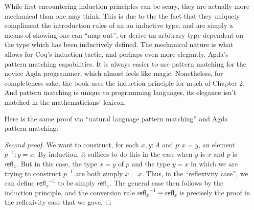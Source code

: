 \documentclass[11pt, a4paper]{article}
\newtheorem{proof}{Proof}
\newcommand{\jdeq}{\equiv}      %
\newcommand{\refl}[1]{\ensuremath{\mathsf{refl}_{#1}}\xspace}
\newcommand{\opp}[1]{\mathord{{#1}^{-1}}}
\begin{document}
While first encountering induction principles can be scary, they are actually
more mechanical than one may think. This is due to the the fact that they
uniquely compliment the introduction rules of an an inductive type, and are
simply a means of showing one can ``map out'', or derive an arbitrary type
dependent on the type which has been inductively defined. The mechanical nature
is what allows for Coq's induction tactic, and perhaps even more elegantly,
Agda's pattern matching capabilities. It is always easier to use pattern
matching for the novice Agda programmer, which almost feels like magic.
Nonetheless, for completeness sake, the book uses the induction principle for
much of Chapter 2. And pattern matching is unique to programming languages,
its elegance isn't matched in the mathematicians' lexicon.

Here is the same proof via ``natural language pattern matching'' and Agda
pattern matching:

\begin{proof}[Second proof]
  We want to construct, for each $x,y:A$ and $p:x=y$, an element $\opp{p}:y=x$.
  By induction, it suffices to do this in the case when $y$ is $x$ and $p$ is $\refl{x}$.
  But in this case, the type $x=y$ of $p$ and the type $y=x$ in which we are trying to construct $\opp{p}$ are both simply $x=x$.
  Thus, in the ``reflexivity case'', we can define $\opp{\refl{x}}$ to be simply $\refl{x}$.
  The general case then follows by the induction principle, and the conversion rule $\opp{\refl{x}}\jdeq\refl{x}$ is precisely the proof in the reflexivity case that we gave.
\end{proof}

\begin{code}%
\>[0]\<%
\\
\>[0][@{}l@{\AgdaIndent{1}}]%
\>[2]\AgdaSpace{}%
\AgdaSymbol{:}\AgdaSpace{}%
\AgdaSymbol{\{}\AgdaSpace{}%
\AgdaSymbol{:}\AgdaSpace{}%
\AgdaSymbol{\}}\AgdaSpace{}%
\AgdaSymbol{\{}\AgdaSpace{}%
\AgdaSpace{}%
\AgdaSymbol{:}\AgdaSpace{}%
\AgdaSymbol{\}}\AgdaSpace{}%
\AgdaSpace{}%
\AgdaSpace{}%
\AgdaSpace{}%
\AgdaSpace{}%
\AgdaSpace{}%
\AgdaSpace{}%
\AgdaSpace{}%
\<%
\\
%
\>[2]\AgdaSpace{}%
\AgdaSymbol{\{}\AgdaSymbol{\}}\AgdaSpace{}%
\AgdaSymbol{\{}\AgdaSymbol{\}}\AgdaSpace{}%
\AgdaSymbol{\{}\AgdaSymbol{\}}\AgdaSpace{}%
\AgdaSpace{}%
\AgdaSymbol{=}\AgdaSpace{}%
\<%
\\
\>[0]\<%
\end{code}
\end{document}
